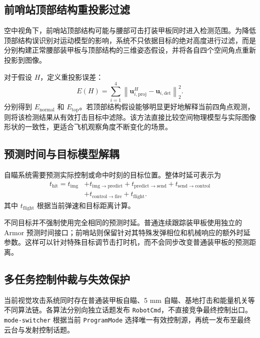 \subsection{前哨站顶部结构重投影过滤}
空中视角下，前哨站顶部结构可能与腰部可击打装甲板同时进入检测范围。为降低顶部结构误识别对运动模型的影响，系统不只依据目标的绝对高度进行过滤，而是分别构建正常腰部装甲板与顶部结构的三维姿态假设，并将各自四个空间角点重新投影到图像。

对于假设 $H$，定义重投影误差：
\begin{equation}
    E(H)=\sum_{i=1}^{4}
    \left\|
        \boldsymbol{u}^{H}_{i,\mathrm{proj}}
        -\boldsymbol{u}_{i,\mathrm{det}}
    \right\|_2^2 .
\end{equation}
分别得到 $E_{\mathrm{normal}}$ 和 $E_{\mathrm{top}}$。若顶部结构假设能够明显更好地解释当前四角点观测，则将该检测结果从有效打击目标中滤除。该方法直接比较空间物理模型与实际图像形状的一致性，更适合飞机观察角度不断变化的场景。

\subsection{预测时间与目标模型解耦}
自瞄系统需要预测实际控制或命中时刻的目标位置。整体时延可表示为
\begin{equation}
\begin{aligned}
    t_{\mathrm{hit}} = t_{\mathrm{img}}
    &+ t_{\mathrm{img\rightarrow predict}}
    + t_{\mathrm{predict\rightarrow send}}
    + t_{\mathrm{send\rightarrow control}} \\
    &+ t_{\mathrm{control\rightarrow fire}}
    + t_{\mathrm{flight}} .
\end{aligned}
\end{equation}
其中 $t_{\mathrm{flight}}$ 根据当前弹速和目标距离计算。

不同目标并不强制使用完全相同的预测时延。普通连续跟踪装甲板使用独立的 Armor 预测时间接口；前哨站则保留针对其特殊发弹相位和机械响应的额外时延参数。这样可以针对特殊目标调节击打时机，而不会同步改变普通装甲板的预测距离。

\subsection{多任务控制仲裁与失效保护}
当前视觉攻击系统同时存在普通装甲板自瞄、5 mm 自瞄、基地打击和能量机关等不同算法链。各算法分别向独立话题发布 \lstinline{RobotCmd}，不直接竞争最终控制出口。\lstinline{mode-switcher} 根据当前 \lstinline{ProgramMode} 选择唯一有效控制源，再统一发布至最终云台与发射控制话题。

